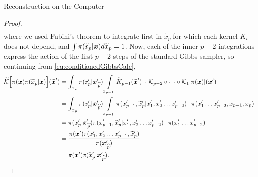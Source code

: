 \begin{chapter}{Reconstruction on the Computer}
\begin{proof}
\begin{align}
  \end{align}
  where we used Fubini's theorem to integrate first in $\tilde x_p$ for which each kernel $K_i$ does not depend, and $\int\pi(\widetilde x_p|\mbox{\boldmath$x$})d\widetilde x_p = 1$. 
  Now, each of the inner $p-2$ integrations express the action of the first $p-2$ steps of the standard Gibbs sampler, so continuing from \eqref{eq:conditionedGibbsCalc}, 
  \begin{align}
    \widetilde{\mathcal K}\Big[ \pi(\mbox{\boldmath$x$})\pi(\widetilde x_p|\mbox{\boldmath$x$})\Big](\widetilde{\mbox{\boldmath$x$}}')
      &= \int_{x_p}\pi(x_p'|\mbox{\boldmath$x$}_{\,\widehat{p}}') \int\limits_{x_{p-1}}\widetilde K_{p-1}(\widetilde{\mbox{\boldmath$x$}}')\,\cdot\,\mathcal K_{p-2}\circ\dots\circ \mathcal K_{1}[\pi(\mbox{\boldmath$x$})](\mbox{\boldmath$x$}')\nonumber \\ 
      &= \int_{x_p}\pi(x_p'|\mbox{\boldmath$x$}_{\,\widehat{p}}') \int\limits_{x_{p-1}}\pi(x_{p-1}',\widetilde x_p'|x_1',x_2'\dots x_{p-2}')\cdot\pi(x_1'\dots x_{p-2}', x_{p-1},x_p)\nonumber \\ 
      &= \pi(x_p'|\mbox{\boldmath$x$}_{\,\widehat{p}}') \pi(x_{p-1}',\widetilde x_p'|x_1',x_2'\dots x_{p-2}')\cdot\pi(x_1'\dots x_{p-2}')\nonumber \\ 
      &= \frac{\pi(\mbox{\boldmath$x$}')\pi(x_1',x_2'\dots x_{p-1}', \widetilde x_p')}{\pi(\mbox{\boldmath$x$}_{\,\widehat{p}}')}\nonumber \\ 
      &= \pi(\mbox{\boldmath$x$}')\pi(\widetilde x_p'|\mbox{\boldmath$x$}_{\,\widehat{p}}').
  \end{align}

\end{proof}
\end{chapter}
